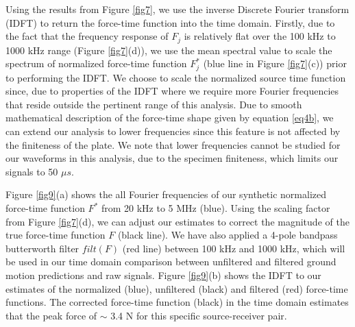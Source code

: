 \documentclass[preprint,3p, 11pt,authoryear]{elsarticle}
\begin{document}
Using the results from Figure \ref{fig7}, we use the inverse Discrete Fourier transform (IDFT) to return the force-time function into the time domain. Firstly, due to the fact that the frequency response of $F_{j}$ is relatively flat over the 100 kHz to 1000 kHz range (Figure \ref{fig7}(d)), we use the mean spectral value to scale the spectrum of normalized force-time function $F_{j}^{*}$ (blue line in Figure \ref{fig7}(c)) prior to performing the IDFT. We choose to scale the normalized source time function since, due to properties of the IDFT where we require more Fourier frequencies that reside outside the pertinent range of this analysis. Due to smooth mathematical description of the force-time shape given by equation \eqref{eq4b}, we can extend our analysis to lower frequencies since this feature is not affected by the finiteness of the plate. We note that lower frequencies cannot be studied for our waveforms in this analysis, due to the specimen finiteness, which limits our signals to 50 $\mu s$.  

Figure \ref{fig9}(a) shows the all Fourier frequencies of our synthetic normalized force-time function $F^{*}$ from 20 kHz to 5 MHz (blue). Using the scaling factor from Figure \ref{fig7}(d), we can adjust our estimates to correct the magnitude of the true force-time function $F$ (black line). We have also applied a 4-pole bandpass butterworth filter $filt(F)$ (red line) between 100 kHz and 1000 kHz, which will be used in our time domain comparison between unfiltered and filtered ground motion predictions and raw signals. Figure \ref{fig9}(b) shows the IDFT to our estimates of the normalized (blue), unfiltered (black) and filtered (red) force-time functions.  The corrected force-time function (black) in the time domain estimates that the peak force of $\sim$ 3.4 N for this specific source-receiver pair. 
\end{document}
